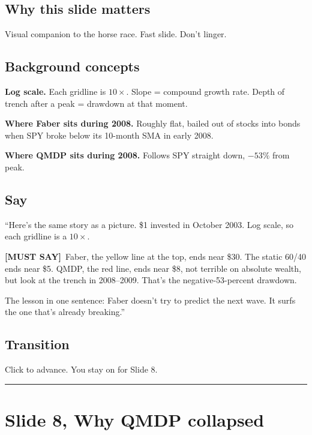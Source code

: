 \documentclass[11pt]{article}
\newcommand{\mustsay}[1]{\textcolor{must}{\textbf{[MUST SAY]}}\ #1}
\begin{document}
\subsection*{Why this slide matters}

Visual companion to the horse race. Fast slide. Don't linger.

\subsection*{Background concepts}

\textbf{Log scale.} Each gridline is $10\times$. Slope = compound growth rate. Depth of trench after a peak = drawdown at that moment.

\textbf{Where Faber sits during 2008.} Roughly flat, bailed out of stocks into bonds when SPY broke below its 10-month SMA in early 2008.

\textbf{Where QMDP sits during 2008.} Follows SPY straight down, $-53\%$ from peak.

\subsection*{Say}

``Here's the same story as a picture. \$1 invested in October 2003. Log scale, so each gridline is a $10\times$.

\mustsay{Faber, the yellow line at the top, ends near \$30. The static 60/40 ends near \$5. QMDP, the red line, ends near \$8, not terrible on absolute wealth, but look at the trench in 2008--2009. That's the negative-53-percent drawdown.}

The lesson in one sentence: Faber doesn't try to predict the next wave. It surfs the one that's already breaking.''

\subsection*{Transition}

Click to advance. You stay on for Slide 8.

\bigskip\hrule

\section*{Slide 8, Why QMDP collapsed}
\end{document}
